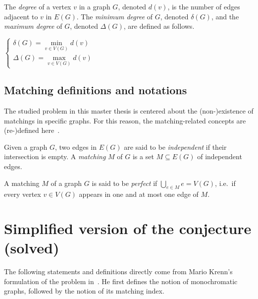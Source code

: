 \begin{definition}
    \label{def:degree}
    The \textit{degree} of a vertex $v$ in a graph $G$, denoted $d(v)$, is the number of edges adjacent to $v$ in $E(G)$.
    The \textit{minimum degree} of $G$, denoted $\delta(G)$, and the \textit{maximum degree} of $G$, denoted $\Delta(G)$, are defined as follows.
    \begin{center}
        $\left\{
        \begin{array}{l}
            \delta(G) = \min\limits_{v \in V(G)} d(v)\\
            \Delta(G) = \max\limits_{v \in V(G)} d(v)
        \end{array}
        \right.$
    \end{center}
\end{definition}


\subsection{Matching definitions and notations}
\label{subsec:matching-definitions-and-notations}

The studied problem in this master thesis is centered about the (non-)existence of matchings in specific graphs.
For this reason, the matching-related concepts are (re-)defined here~\cite{graphtheory}.

\begin{definition}[Matching]
    \label{def:matching}
    Given a graph $G$, two edges in $E(G)$ are said to be \textit{independent} if their intersection is empty.
    A \textit{matching} $M$ of $G$ is a set $M \subseteq E(G)$ of independent edges.
\end{definition}

\begin{definition}
    \label{def:perfect_matching}
    A matching $M$ of a graph $G$ is said to be \textit{perfect} if $\bigcup\limits_{e \in M} e = V(G)$, i.e.\ if every vertex $v \in V(G)$ appears in one and at most one edge of $M$.
\end{definition}


\section{Simplified version of the conjecture (solved)}
\label{sec:simplified-version-of-the-conjecture}

The following statements and definitions directly come from Mario Krenn's formulation of the problem in~\cite{wordpress}.
He first defines the notion of monochromatic graphs, followed by the notion of its matching index.

